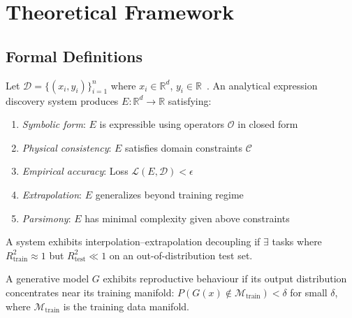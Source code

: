 \documentclass[twoside,11pt]{article}
\newcommand{\Rtrain}{R^{2}_{\mathrm{train}}}
\newcommand{\Rtest}{R^{2}_{\mathrm{test}}}
\begin{document}
\section{Theoretical Framework}
\label{sec:theory}

\subsection{Formal Definitions}\label{subsec:formal-definitions}
\label{sec:theory_defs}

\begin{definition}
Let $\mathcal{D} = \{(x_i, y_i)\}_{i=1}^n$ where $x_i \in \mathbb{R}^d$, $y_i \in \mathbb{R}$~\citep{udrescu2020ai}. An analytical expression discovery system produces $E: \mathbb{R}^d \to \mathbb{R}$ satisfying:
\begin{enumerate}
  \item \textit{Symbolic form}: $E$ is expressible using operators $\mathcal{O}$ in closed form
  \item \textit{Physical consistency}: $E$ satisfies domain constraints $\mathcal{C}$
  \item \textit{Empirical accuracy}: Loss $\mathcal{L}(E, \mathcal{D}) < \epsilon$
  \item \textit{Extrapolation}: $E$ generalizes beyond training regime
  \item \textit{Parsimony}: $E$ has minimal complexity given above constraints
\end{enumerate}
\end{definition}

\begin{definition}
\label{def:decoupling}
A system exhibits interpolation--extrapolation decoupling if $\exists$ tasks where $\Rtrain \approx 1$ but $\Rtest \ll 1$ on an out-of-distribution test set.
\end{definition}

\begin{definition}
\label{def:reproductive}
A generative model $G$ exhibits reproductive behaviour if its output distribution concentrates near its training manifold: $P(G(x) \notin \mathcal{M}_{\text{train}}) < \delta$ for small $\delta$, where $\mathcal{M}_{\text{train}}$ is the training data manifold.
\end{definition}
\end{document}
